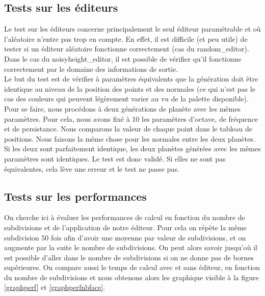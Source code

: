 \documentclass[a4paper]{article}
\begin{document}
\subsection{Tests sur les éditeurs}

Le test sur les éditeurs concerne principalement le seul éditeur paramétrable et où l'aléatoire n'entre pas trop en compte. En effet, il est difficile (et peu utile) de tester si un éditeur aléatoire fonctionne correctement (cas du random\_editor). Dans le cas du noisyheight\_editor, il est possible de vérifier qu'il fonctionne correctement par le domaine des informations de sortie.\\

Le but du test est de vérifier à paramètres équivalents que la génération doit être identique au niveau de la position des points et des normales (ce qui n'est pas le cas des couleurs qui peuvent légèrement varier au vu de la palette disponible). Pour se faire, nous procédons à deux générations de planète avec les mêmes paramètres. Pour cela, nous avons fixé à 10 les paramètres d'octave, de fréquence et de persistance. Nous comparons la valeur de chaque point dans le tableau de positions. Nous faisons la même chose pour les normales entre les deux planètes. Si les deux sont parfaitement identique, les deux planètes générées avec les mêmes paramètres sont identiques. Le test est donc validé. Si elles ne sont pas équivalentes, cela lève une erreur et le test ne passe pas.

\subsection{Tests sur les performances}

On cherche ici à évaluer les performances de calcul en fonction du nombre de subdivisions et de l'application de notre éditeur. Pour cela on répète la même subdivision 50 fois afin d'avoir une moyenne par valeur de subdivisions, et on augmente par la suite le nombre de subdivisions. On peut alors savoir jusqu'où il est possible d'aller dans le nombre de subdivisions si on ne donne pas de bornes supérieures. On compare aussi le temps de calcul avec et sans éditeur, en fonction du nombre de subdivisions et nous obtenons alors les graphique visible à la figure \ref{graphperf} et \ref{graphperfnbface}.\\
\end{document}
